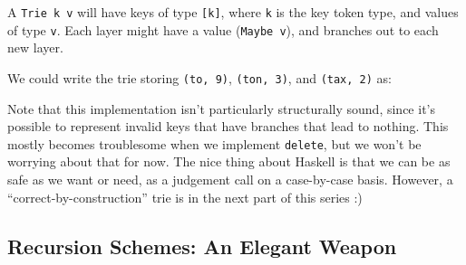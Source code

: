 \documentclass[]{article}
\newenvironment{Shaded}{}{}
\newcommand{\CharTok}[1]{\textcolor[rgb]{0.25,0.44,0.63}{#1}}
\newcommand{\CommentTok}[1]{\textcolor[rgb]{0.38,0.63,0.69}{\textit{#1}}}
\newcommand{\DataTypeTok}[1]{\textcolor[rgb]{0.56,0.13,0.00}{#1}}
\newcommand{\DecValTok}[1]{\textcolor[rgb]{0.25,0.63,0.44}{#1}}
\newcommand{\FunctionTok}[1]{\textcolor[rgb]{0.02,0.16,0.49}{#1}}
\newcommand{\NormalTok}[1]{#1}
\newcommand{\OtherTok}[1]{\textcolor[rgb]{0.00,0.44,0.13}{#1}}
\begin{document}
A \texttt{Trie\ k\ v} will have keys of type \texttt{{[}k{]}}, where \texttt{k}
is the key token type, and values of type \texttt{v}. Each layer might have a
value (\texttt{Maybe\ v}), and branches out to each new layer.

We could write the trie storing \texttt{(to,\ 9)}, \texttt{(ton,\ 3)}, and
\texttt{(tax,\ 2)} as:

\begin{Shaded}
\end{Shaded}

Note that this implementation isn't particularly structurally sound, since it's
possible to represent invalid keys that have branches that lead to nothing. This
mostly becomes troublesome when we implement \texttt{delete}, but we won't be
worrying about that for now. The nice thing about Haskell is that we can be as
safe as we want or need, as a judgement call on a case-by-case basis. However, a
``correct-by-construction'' trie is in the next part of this series :)

\hypertarget{recursion-schemes-an-elegant-weapon}{%
\subsection{Recursion Schemes: An Elegant
Weapon}\label{recursion-schemes-an-elegant-weapon}}
\end{document}
